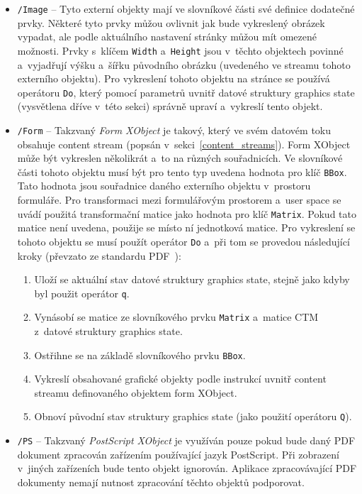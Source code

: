 \begin{itemize}
    \item \texttt{/Image} -- Tyto externí objekty mají ve slovníkové části své
    definice dodatečné prvky. Některé tyto prvky můžou ovlivnit jak bude
    vykreslený obrázek vypadat, ale podle aktuálního nastavení stránky můžou mít
    omezené možnosti. Prvky s~klíčem \texttt{Width} a~\texttt{Height}
    jsou v~těchto objektech povinné a~vyjadřují výšku a~šířku původního obrázku
    (uvedeného ve streamu tohoto externího objektu). Pro vykreslení
    tohoto objektu na stránce se používá operátoru \texttt{Do}, který 
    pomocí parametrů uvnitř datové struktury graphics state (vysvětlena dříve
    v~této sekci) správně upraví a~vykreslí tento objekt.
    
    \item \texttt{/Form} -- Takzvaný \emph{Form XObject} je takový, který ve svém
    datovém toku obsahuje content stream (popsán v~sekci~\ref{content_streams}).
    Form XObject může být vykreslen několikrát a~to na různých souřadnicích.
    Ve slovníkové části tohoto objektu musí být pro tento typ uvedena hodnota
    pro klíč \texttt{BBox}. Tato hodnota jsou souřadnice daného externího objektu
    v~prostoru formuláře. Pro transformaci mezi formulářovým prostorem a~user
    space se uvádí použitá transformační matice jako hodnota pro klíč
    \texttt{Matrix}. Pokud tato matice není uvedena, použije se místo ní
    jednotková matice. Pro vykreslení se tohoto objektu se musí použít operátor
    \texttt{Do} a~při tom se provedou následující kroky (převzato ze standardu
    PDF~\cite[k.~8.10.1, s.~218]{PDF32000-1:2008}):
    \begin{enumerate}
        \item Uloží se aktuální stav datové struktury graphics state, stejně
        jako kdyby byl použit operátor \texttt{q}.
        \item Vynásobí se matice ze slovníkového prvku \texttt{Matrix} a~matice
        CTM z~datové struktury graphics state.
        \item Ostřihne se na základě slovníkového prvku \texttt{BBox}.
        \item Vykreslí obsahované  grafické objekty podle instrukcí uvnitř content
        streamu definovaného objektem form XObject.
        \item Obnoví původní stav struktury graphics state (jako použití operátoru
        \texttt{Q}).
    \end{enumerate}
    
    \item \texttt{/PS} -- Takzvaný \emph{PostScript XObject} je využíván pouze
    pokud bude daný PDF dokument zpracován zařízením používající jazyk PostScript.
    Při zobrazení v~jiných zařízeních bude tento objekt ignorován. Aplikace
    zpracovávající PDF dokumenty nemají nutnost zpracování těchto objektů
    podporovat.
\end{itemize}


